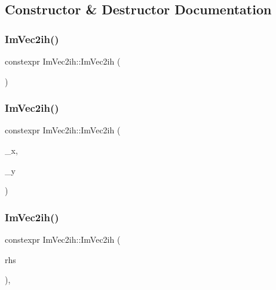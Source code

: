 \subsection{Constructor \& Destructor Documentation}
\mbox{\label{structImVec2ih_ac20cf588ef0083368ec9c9db8dcf3991}} 
\subsubsection{\texorpdfstring{Im\+Vec2ih()}{ImVec2ih()}\hspace{0.1cm}{\footnotesize\ttfamily [1/3]}}
{\footnotesize\ttfamily constexpr Im\+Vec2ih\+::\+Im\+Vec2ih (\begin{DoxyParamCaption}{ }\end{DoxyParamCaption})\hspace{0.3cm}{\ttfamily [inline]}}

\mbox{\label{structImVec2ih_a949d670852c030a496109290b62fb98b}} 
\subsubsection{\texorpdfstring{Im\+Vec2ih()}{ImVec2ih()}\hspace{0.1cm}{\footnotesize\ttfamily [2/3]}}
{\footnotesize\ttfamily constexpr Im\+Vec2ih\+::\+Im\+Vec2ih (\begin{DoxyParamCaption}\item[{short}]{\+\_\+x,  }\item[{short}]{\+\_\+y }\end{DoxyParamCaption})\hspace{0.3cm}{\ttfamily [inline]}}

\mbox{\label{structImVec2ih_a4ff068f147001fc898e28068d1bee03c}} 
\subsubsection{\texorpdfstring{Im\+Vec2ih()}{ImVec2ih()}\hspace{0.1cm}{\footnotesize\ttfamily [3/3]}}
{\footnotesize\ttfamily constexpr Im\+Vec2ih\+::\+Im\+Vec2ih (\begin{DoxyParamCaption}\item[{const \hyperlink{structImVec2}{Im\+Vec2} \&}]{rhs }\end{DoxyParamCaption})\hspace{0.3cm}{\ttfamily [inline]}, {\ttfamily [explicit]}}



